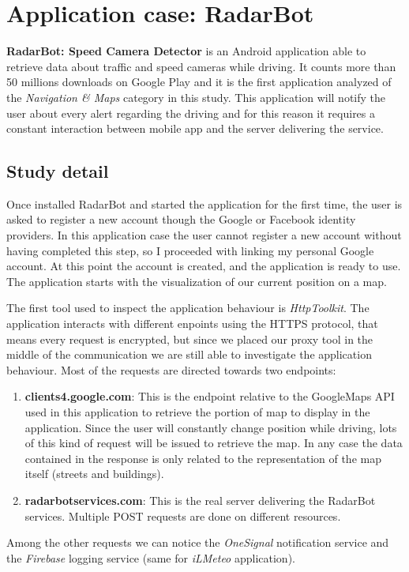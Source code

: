 \section{Application case: RadarBot}
	\par \textbf{RadarBot: Speed Camera Detector } is an Android application able to retrieve data about traffic and speed cameras while driving. It counts more than 50 millions downloads on Google Play and it is the first application analyzed of the \textit{Navigation \& Maps} category in this study. This application will notify the user about every alert regarding the driving and for this reason it requires a constant interaction between mobile app and the server delivering the service. 
	
	\subsection{Study detail}
		\par Once installed RadarBot and started the application for the first time, the user is asked to register a new account though the Google or Facebook identity providers. In this application case the user cannot register a new account without having completed this step, so I proceeded with linking my personal Google account. At this point the account is created, and the application is ready to use. The application starts with the visualization of our current position on a map. \newline
		\par The first tool used to inspect the application behaviour is \textit{HttpToolkit}. The application interacts with different enpoints using the HTTPS protocol, that means every request is encrypted, but since we placed our proxy tool in the middle of the communication we are still able to investigate the application behaviour. Most of the requests are directed towards two endpoints:
		\begin{enumerate}
			\item \textbf{clients4.google.com}: This is the endpoint relative to the GoogleMaps API used in this application to retrieve the portion of map to display in the application. Since the user will constantly change position while driving, lots of this kind of request will be issued to retrieve the map. In any case the data contained in the response is only related to the representation of the map itself (streets and buildings).
			\item \textbf{radarbotservices.com}: This is the real server delivering the RadarBot services. Multiple POST requests are done on different resources.
		\end{enumerate}
		Among the other requests we can notice the \textit{OneSignal} notification service and the \textit{Firebase} logging service (same for \textit{iLMeteo} application).
		

